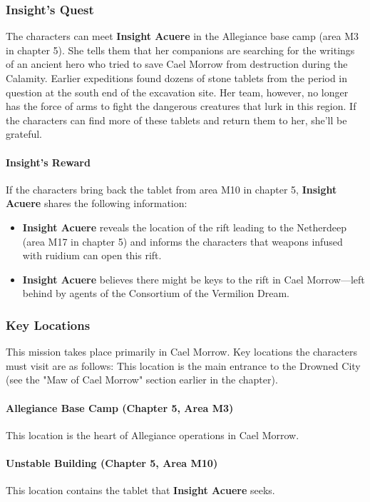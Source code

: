 \documentclass[10pt,a4,twoside,twocolumn,openany,nodeprecatedcode]{dndbook}
\begin{document}
\subsubsection{Insight's Quest}
The characters can meet \textbf{Insight Acuere} in the Allegiance base camp (area M3 in chapter 5). She tells them that her companions are searching for the writings of an ancient hero who tried to save Cael Morrow from destruction during the Calamity. Earlier expeditions found dozens of stone tablets from the period in question at the south end of the excavation site. Her team, however, no longer has the force of arms to fight the dangerous creatures that lurk in this region. If the characters can find more of these tablets and return them to her, she'll be grateful.
\paragraph{Insight's Reward}
If the characters bring back the tablet from area M10 in chapter 5, \textbf{Insight Acuere} shares the following information:
\begin{itemize}

\item \textbf{Insight Acuere} reveals the location of the rift leading to the Netherdeep (area M17 in chapter 5) and informs the characters that weapons infused with ruidium can open this rift.
\item \textbf{Insight Acuere} believes there might be keys to the rift in Cael Morrow—left behind by agents of the Consortium of the Vermilion Dream.
\end{itemize}


\subsubsection{Key Locations}
This mission takes place primarily in Cael Morrow. Key locations the characters must visit are as follows:
{{This location is the main entrance to the Drowned City (see the "Maw of Cael Morrow" section earlier in the chapter).}}
\paragraph{Allegiance Base Camp (Chapter 5, Area M3)}
This location is the heart of Allegiance operations in Cael Morrow.
\paragraph{Unstable Building (Chapter 5, Area M10)}
This location contains the tablet that \textbf{Insight Acuere} seeks.
\end{document}
